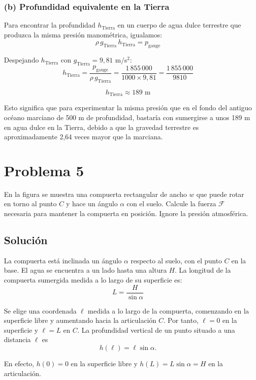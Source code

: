 \documentclass[a4paper]{article}
\begin{document}
\subsubsection{(b) Profundidad equivalente en la Tierra}

Para encontrar la profundidad $h_{\text{Tierra}}$ en un cuerpo de agua dulce terrestre que produzca la misma presión manométrica, igualamos:
$$
\rho\, g_{\text{Tierra}}\, h_{\text{Tierra}} = p_{\text{gauge}}
$$

Despejando $h_{\text{Tierra}}$ con $g_{\text{Tierra}} = 9{,}81$ m/s$^2$:
$$
h_{\text{Tierra}} = \frac{p_{\text{gauge}}}{\rho\, g_{\text{Tierra}}} = \frac{1\,855\,000}{1000 \times 9{,}81} = \frac{1\,855\,000}{9810}
$$

$$
\boxed{h_{\text{Tierra}} \approx 189 \text{ m}}
$$

Esto significa que para experimentar la misma presión que en el fondo del antiguo océano marciano de 500 m de profundidad, bastaría con sumergirse a unos 189 m en agua dulce en la Tierra, debido a que la gravedad terrestre es aproximadamente 2{,}64 veces mayor que la marciana.

\section{Problema 5}
En la figura se muestra una compuerta rectangular de ancho $w$ que puede rotar en torno al punto $C$ y hace un ángulo $\alpha$ con el suelo. Calcule la fuerza $\mathcal{F}$ necesaria para mantener la compuerta en posición. Ignore la presión atmosférica.



\subsection{Solución}

La compuerta está inclinada un ángulo $\alpha$ respecto al suelo, con el punto $C$ en la base. El agua se encuentra a un lado hasta una altura $H$. La longitud de la compuerta sumergida medida a lo largo de su superficie es:
$$
L = \frac{H}{\sin\alpha}
$$

Se elige una coordenada $\ell$ medida a lo largo de la compuerta, comenzando en la superficie libre y aumentando hacia la articulación $C$. Por tanto, $\ell=0$ en la superficie y $\ell=L$ en $C$. La profundidad vertical de un punto situado a una distancia $\ell$ es
$$
h(\ell)=\ell\sin\alpha.
$$

En efecto, $h(0)=0$ en la superficie libre y $h(L)=L\sin\alpha=H$ en la articulación.
\end{document}
